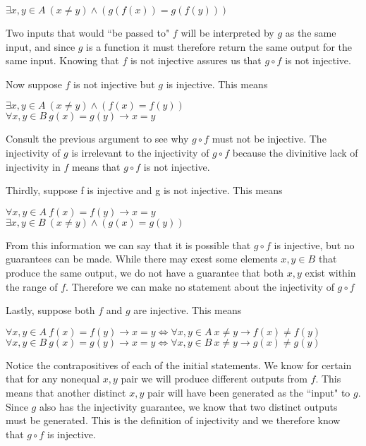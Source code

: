 \begin{center}
  $\exists x,y \in A ~ (x \neq y) \land (g(f(x)) = g(f(y)))$ \\
\end{center}

Two inputs that would ``be passed to" $f$ will be interpreted by $g$ as the same input, and since $g$ is a function it must therefore return the same output for the same input. Knowing that $f$ is not injective assures us that $g \circ f$ is not injective.

Now suppose $f$ is not injective but $g$ is injective. This means
\begin{center}
  $\exists x,y \in A ~ (x \neq y) \land (f(x) = f(y))$ \\
  $\forall x,y \in B ~ g(x) = g(y) \rightarrow x = y$ \\
\end{center}

Consult the previous argument to see why $g \circ f$ must not be injective. The injectivity of $g$ is irrelevant to the injectivity of $g \circ f$ because the divinitive lack of injectivity in $f$ means that $g \circ f$ is not injective.

Thirdly, suppose f is injective and g is not injective. This means
\begin{center}
  $\forall x,y \in A ~ f(x) = f(y) \rightarrow x = y$ \\
  $\exists x,y \in B ~ (x \neq y) \land (g(x) = g(y))$ \\
\end{center}

From this information we can say that it is possible that $g \circ f$ is injective, but no guarantees can be made. While there may exest some elements $x,y \in B$ that produce the same output, we do not have a guarantee that both $x,y$ exist within the range of $f$. Therefore we can make no statement about the injectivity of $g \circ f$

Lastly, suppose both $f$ and $g$ are injective. This means
\begin{center}
  $\forall x,y \in A ~ f(x) = f(y) \rightarrow x = y \iff \forall x,y \in A ~ x \neq y \rightarrow f(x) \neq f(y)$ \\
  $\forall x,y \in B ~ g(x) = g(y) \rightarrow x = y \iff \forall x,y \in B ~ x \neq y \rightarrow g(x) \neq g(y)$ \\
\end{center}

Notice the contrapositives of each of the initial statements. We know for certain that for any nonequal $x,y$ pair we will produce different outputs from $f$. This means that another distinct $x,y$ pair will have been generated as the ``input" to $g$. Since $g$ also has the injectivity guarantee, we know that two distinct outputs must be generated. This is the definition of injectivity and we therefore know that $g \circ f$ is injective.

